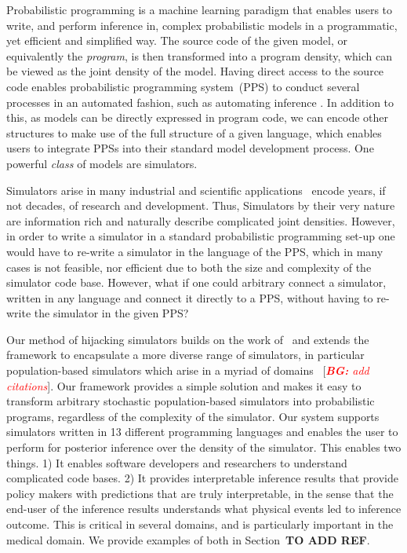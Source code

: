 \documentclass{article}
\newcommand{\bg}[1]{~{{[{\it \textcolor{red}{{\bf BG:} #1}}]}}}
\begin{document}


Probabilistic programming\cite{gordon2014probabilistic,le2016inference} is a machine learning paradigm that enables users to write, and perform inference in, complex probabilistic models in a programmatic, yet efficient and simplified way. 
The source code of the given model, or equivalently the \emph{program}, is then transformed into a program density, which can
be viewed as the joint density of the model.
Having direct access to the source code enables probabilistic programming system~(PPS)
to conduct several processes in an automated fashion, such as 
automating inference \cite{zhou2019lf,goodman2012church,wood2014new}.
In addition to this, as models can be directly expressed in program code, we can encode other structures to make use of the full structure of a given language,
which enables users to integrate PPSs into their standard model development process.
One powerful \emph{class} of models are simulators. 


Simulators arise in many industrial \cite{di2015simulator,judd2009numerically,kass1990rapid} and scientific applications~\cite{smith2008towards,bershteyn2018implementation,gleisberg_event_2008} encode years, if not decades, of research and development.
Thus, Simulators by their very nature are
information rich and naturally describe complicated joint densities.
However, in order to write a simulator in a standard probabilistic programming set-up one would have to re-write a simulator in the language of the PPS, which 
in many cases is not feasible, nor efficient due to both the size 
and complexity of the simulator code base. 
However, what if one could arbitrary connect a simulator, written in any
language and connect it directly to a PPS, without having to re-write
the simulator in the given PPS?


    
Our method of hijacking simulators builds on the work of~\cite{baydin2018efficient} and extends the framework to encapsulate a more diverse range of simulators, in particular population-based simulators which arise
in a myriad of domains \bg{add citations}. 
Our framework provides a simple solution and makes it easy to transform arbitrary stochastic population-based simulators into probabilistic programs, regardless of the complexity of the simulator. 
Our system supports simulators written in 13 different programming languages and enables the user to perform for posterior inference over the density of the simulator. 
This enables two things.
1) It enables software developers and researchers to understand complicated code bases. 
2) It provides interpretable inference results that provide policy makers with predictions that are truly interpretable, in the sense that the end-user of the inference results understands what physical events led to inference outcome. 
This is critical in several domains, and is particularly important in the medical domain. We provide examples of both in Section~\textbf{TO ADD REF}.
\end{document}
